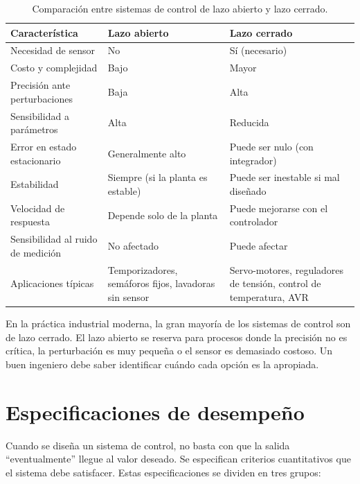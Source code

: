 \begin{table}[htbp]
  \centering
  \caption{Comparación entre sistemas de control de lazo abierto y lazo cerrado.}
  \label{tab:oa-vs-oc}
  \begin{tabularx}{\textwidth}{@{} l X X @{}}
    \toprule
    \textbf{Característica} & \textbf{Lazo abierto} & \textbf{Lazo cerrado} \\
    \midrule
    Necesidad de sensor & No & Sí (necesario) \\
    Costo y complejidad & Bajo & Mayor \\
    Precisión ante perturbaciones & Baja & Alta \\
    Sensibilidad a parámetros & Alta & Reducida \\
    Error en estado estacionario & Generalmente alto & Puede ser nulo (con integrador) \\
    Estabilidad & Siempre (si la planta es estable) & Puede ser inestable si mal diseñado \\
    Velocidad de respuesta & Depende solo de la planta & Puede mejorarse con el controlador \\
    Sensibilidad al ruido de medición & No afectado & Puede afectar \\
    Aplicaciones típicas & Temporizadores, semáforos fijos,
                           lavadoras sin sensor & Servo-motores, reguladores de tensión,
                           control de temperatura, AVR \\
    \bottomrule
  \end{tabularx}
\end{table}

\begin{observacion}
  En la práctica industrial moderna, la gran mayoría de los sistemas de
  control son de lazo cerrado. El lazo abierto se reserva para procesos
  donde la precisión no es crítica, la perturbación es muy pequeña o el
  sensor es demasiado costoso. Un buen ingeniero debe saber identificar
  cuándo cada opción es la apropiada.
\end{observacion}

\section{Especificaciones de desempeño}
\label{sec:intro-especificaciones}

Cuando se diseña un sistema de control, no basta con que la salida
``eventualmente'' llegue al valor deseado. Se especifican criterios cuantitativos
que el sistema debe satisfacer. Estas especificaciones se dividen en tres grupos:

